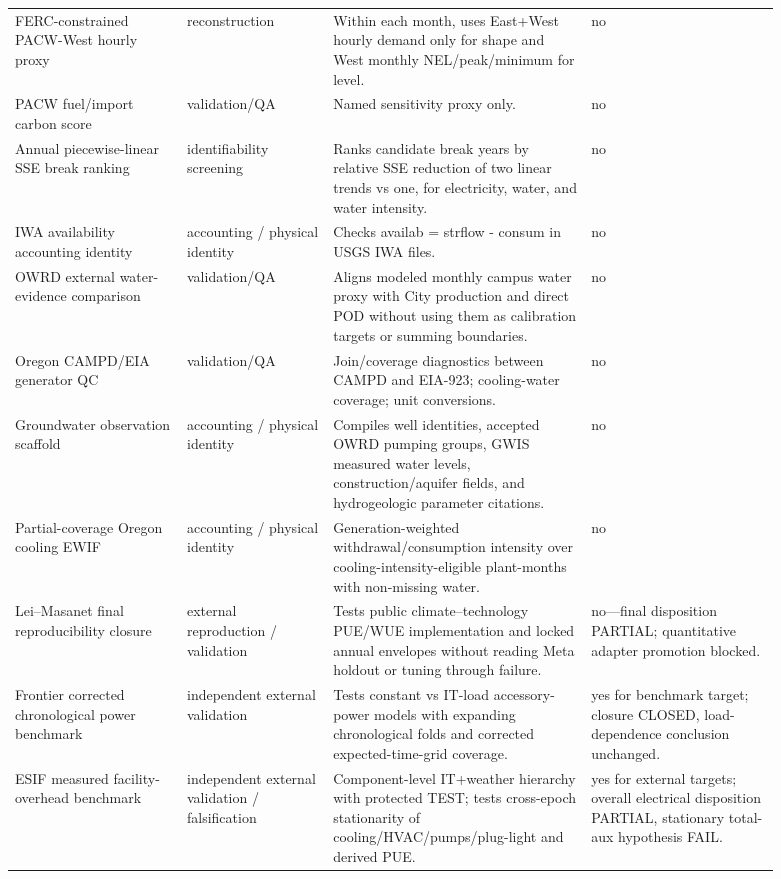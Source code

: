 \documentclass[11pt]{article}
\newcommand{\latesttxt}[1]{\textcolor{purple!85!black}{#1}}
\begin{document}
\begin{longtable}{@{}p{0.20\linewidth}p{0.17\linewidth}p{0.30\linewidth}p{0.22\linewidth}@{}}
FERC-constrained PACW-West hourly proxy & reconstruction & Within each month, uses East+West hourly demand only for shape and West monthly NEL/peak/minimum for level. & no\\
PACW fuel/import carbon score & validation/QA & Named sensitivity proxy only. & no\\
Annual piecewise-linear SSE break ranking & identifiability screening & Ranks candidate break years by relative SSE reduction of two linear trends vs one, for electricity, water, and water intensity. & no\\
IWA availability accounting identity & accounting / physical identity & Checks availab = strflow - consum in USGS IWA files. & no\\
OWRD external water-evidence comparison & validation/QA & Aligns modeled monthly campus water proxy with City production and direct POD without using them as calibration targets or summing boundaries. & no\\
Oregon CAMPD/EIA generator QC & validation/QA & Join/coverage diagnostics between CAMPD and EIA-923; cooling-water coverage; unit conversions. & no\\
Groundwater observation scaffold & accounting / physical identity & Compiles well identities, accepted OWRD pumping groups, GWIS measured water levels, construction/aquifer fields, and hydrogeologic parameter citations. & no\\
Partial-coverage Oregon cooling EWIF & accounting / physical identity & Generation-weighted withdrawal/consumption intensity over cooling-intensity-eligible plant-months with non-missing water. & no\\
\latesttxt{Lei--Masanet final reproducibility closure} & \latesttxt{external reproduction / validation} & \latesttxt{Tests public climate--technology PUE/WUE implementation and locked annual envelopes without reading Meta holdout or tuning through failure.} & \latesttxt{no---final disposition PARTIAL; quantitative adapter promotion blocked.}\\
\latesttxt{Frontier corrected chronological power benchmark} & \latesttxt{independent external validation} & \latesttxt{Tests constant vs IT-load accessory-power models with expanding chronological folds and corrected expected-time-grid coverage.} & \latesttxt{yes for benchmark target; closure CLOSED, load-dependence conclusion unchanged.}\\
\latesttxt{ESIF measured facility-overhead benchmark} & \latesttxt{independent external validation / falsification} & \latesttxt{Component-level IT+weather hierarchy with protected TEST; tests cross-epoch stationarity of cooling/HVAC/pumps/plug-light and derived PUE.} & \latesttxt{yes for external targets; overall electrical disposition PARTIAL, stationary total-aux hypothesis FAIL.}\\

\end{longtable}
\end{document}
